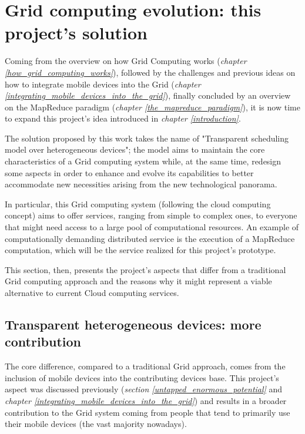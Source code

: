 \section{Grid computing evolution: this project's solution}
Coming from the overview on how Grid Computing works (\textit{chapter \ref{how_grid_computing_works}}), followed by the challenges and previous ideas on how to integrate mobile devices into the Grid (\textit{chapter \ref{integrating_mobile_devices_into_the_grid}}), finally concluded by an overview on the MapReduce paradigm (\textit{chapter \ref{the_mapreduce_paradigm}}), it is now time to expand this project's idea introduced in \textit{chapter \ref{introduction}}.

The solution proposed by this work takes the name of "Transparent scheduling model over heterogeneous devices"; the model aims to maintain the core characteristics of a Grid computing system while, at the same time, redesign some aspects in order to enhance and evolve its capabilities to better accommodate new necessities arising from the new technological panorama.

In particular, this Grid computing system (following the cloud computing concept) aims to offer services, ranging from simple to complex ones, to everyone that might need access to a large pool of computational resources. An example of computationally demanding distributed service is the execution of a MapReduce computation, which will be the service realized for this project's prototype.

This section, then, presents the project's aspects that differ from a traditional Grid computing approach and the reasons why it might represent a viable alternative to current Cloud computing services.

\subsection{Transparent heterogeneous devices: more contribution}\label{transparent_heterogeneous_devices_more_contribution}
The core difference, compared to a traditional Grid approach, comes from the inclusion of mobile devices into the contributing devices base.
This project's aspect was discussed previously (\textit{section \ref{untapped_enormous_potential}} and \textit{chapter \ref{integrating_mobile_devices_into_the_grid}}) and results in a broader contribution to the Grid system coming from people that tend to primarily use their mobile devices (the vast majority nowadays).

